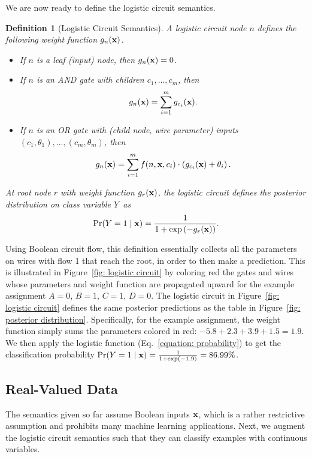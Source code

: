 \documentclass[letterpaper]{article} %
\newtheorem{definition}{Definition}
\newcommand{\node}{n}
\newcommand{\coe}{g}
\newcommand{\sample}{{\bf x}}
\begin{document}
We are now ready to define the logistic circuit semantics.
\begin{definition}[Logistic Circuit Semantics]
\label{de: circuit semantics}
A logistic circuit node $n$ defines the following weight function $\coe_{\node}({\bf x})$.
\begin{itemize}
\item[--] If $\node$ is a leaf (input) node, then $\coe_{\node}({\bf x}) = 0$.

\item[--] If $\node$ is an AND gate with children $c_1,\dots,c_m$, then
\begin{align*}
{\coe}_{\node}({\bf x}) =  \sum_{i=1}^m \coe_{c_i}({\bf x}).
\end{align*}

\item[--] If $\node$ is an OR gate with (child node, wire parameter) inputs $(c_1,\theta_1),\dots, (c_m, \theta_m)$, then
\begin{align*}
{\coe}_{\node}({\bf x}) =    \sum_{i=1}^m  f(n, {\bf x}, c_i) \cdot \left({\coe}_{c_i}({\bf x}) + \theta_i\right).
\end{align*}
\end{itemize}
At root node $r$ with weight function $\coe_r({\bf x})$, the logistic circuit defines the posterior distribution on class variable $Y$~as
\begin{align}
\label{equation: probability}
{\Pr} ( Y = 1 \mid {\bf x}) = \frac{1}{1 + \exp\left(-\coe_{r}({\bf x})  \right)}.
\end{align}
\end{definition}
Using Boolean circuit flow, this definition essentially collects all the parameters on wires with flow 1 that reach the root, in order to then make a prediction.
This is illustrated in Figure~\ref{fig: logistic circuit} by coloring red the gates and wires whose parameters and weight function are propagated upward for the example assignment $A=0$, $B=1$, $C=1$, $D=0$.
The logistic circuit in Figure~\ref{fig: logistic circuit} defines the same posterior predictions as the table in Figure~\ref{fig: posterior distribution}. Specifically, for the example assignment, the weight function simply sums the parameters colored in red: $-5.8+2.3+3.9+1.5 = 1.9$. We then apply the logistic function (Eq.~\ref{equation: probability}) to get the classification probability $\Pr(Y=1 \mid \sample) = \frac{1}{1+\exp(-1.9)} = 86.99\%$. 


\subsection{Real-Valued Data}
\label{s: real-valued data}
The semantics given so far assume Boolean inputs $\sample$, which is a rather restrictive assumption and prohibits many machine learning applications.
Next, we augment the logistic circuit semantics such that they can classify examples with continuous variables.
\end{document}
